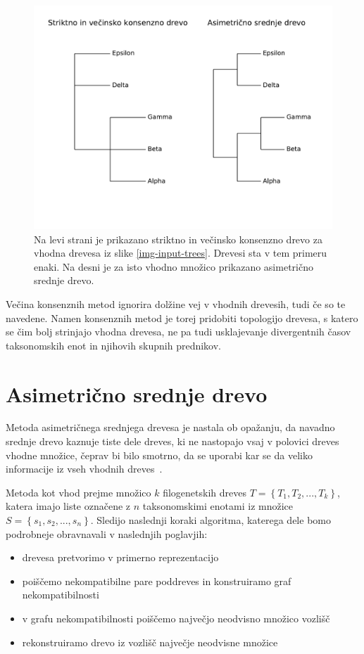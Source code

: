 \documentclass[a4paper, 12pt]{book}
\begin{document}
\begin{figure}[h!]
	\begin{center}
		\includegraphics[scale=0.65, clip=true, trim=0 3cm 0 9mm]{gfx/strict_majority_amt_ex.pdf}
	\end{center}
	\caption{Na levi strani je prikazano striktno in večinsko konsenzno drevo za vhodna drevesa iz slike \ref{img-input-trees}. Drevesi sta v tem primeru enaki. Na desni je za isto vhodno množico prikazano asimetrično srednje drevo.}
	\label{img-strict-majority-amt-example}
\end{figure}

Večina konsenznih metod ignorira dolžine vej v vhodnih drevesih, tudi če so te navedene. Namen konsenznih metod je torej pridobiti topologijo drevesa, s katero se čim bolj strinjajo vhodna drevesa, ne pa tudi usklajevanje divergentnih časov taksonomskih enot in njihovih skupnih prednikov.  

\chapter{Asimetrično srednje drevo}
Metoda asimetričnega srednjega drevesa je nastala ob opažanju, da navadno srednje drevo kaznuje tiste dele dreves, ki ne nastopajo vsaj v polovici dreves vhodne množice, čeprav bi bilo smotrno, da se uporabi kar se da veliko informacije iz vseh vhodnih dreves~\cite{pw}.

Metoda kot vhod prejme množico $k$ filogenetskih dreves $T = \left\{ {T_1, T_2, ..., T_k} \right\}$, katera imajo liste označene z $n$ taksonomskimi enotami iz množice $S = \left\{ {s_1, s_2, ..., s_n} \right\}$. Sledijo naslednji koraki algoritma, katerega dele bomo podrobneje obravnavali v naslednjih poglavjih:
\begin{itemize}
	\item drevesa pretvorimo v primerno reprezentacijo
	\item poiščemo nekompatibilne pare poddreves in konstruiramo graf nekompatibilnosti
	\item v grafu nekompatibilnosti poiščemo največjo neodvisno množico vozlišč
	\item rekonstruiramo drevo iz vozlišč največje neodvisne množice
\end{itemize}
\end{document}
